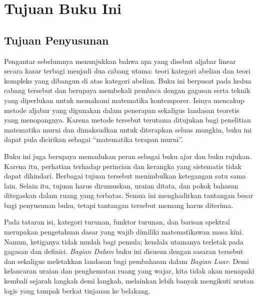 
\section*{Tujuan Buku Ini}
\hypertarget{o014.aljabr2.prelude.book-purpose}{ }

\subsection*{Tujuan Penyusunan}

Pengantar sebelumnya menunjukkan bahwa apa yang disebut aljabar linear
secara kasar terbagi menjadi dua cabang utama: teori kategori abelian dan
teori kompleks yang dibangun di atas kategori abelian. Buku ini berpusat
pada kedua cabang tersebut dan berupaya membekali pembaca dengan gagasan
serta teknik yang diperlukan untuk memahami matematika kontemporer.
Isinya mencakup metode aljabar yang digunakan dalam penerapan sekaligus
landasan teoretis yang menopangnya. Karena metode tersebut terutama
ditujukan bagi penelitian matematika murni dan dimaksudkan untuk diterapkan
seluas mungkin, buku ini dapat pula dicirikan sebagai
``matematika terapan murni''.

Buku ini juga berupaya memadukan peran sebagai buku ajar dan buku
rujukan. Karena itu, perhatian terhadap perincian dan kerangka yang
sistematis tidak dapat dihindari. Berbagai tujuan tersebut menimbulkan
ketegangan satu sama lain. Selain itu, tujuan harus dirumuskan, uraian ditata, dan
pokok bahasan ditegaskan dalam ruang yang terbatas. Semua ini menghadirkan
tantangan besar bagi penyusunan buku, tetapi tantangan tersebut memang
harus diterima.

Pada tataran isi, kategori turunan, funktor turunan, dan barisan spektral
merupakan pengetahuan dasar yang wajib dimiliki matematikawan masa kini.
Namun, ketiganya tidak mudah bagi pemula; kendala utamanya terletak pada
gagasan dan definisi. \emph{Bagian Dalam} buku ini disusun dengan sasaran
tersebut dan sekaligus meletakkan landasan bagi pembahasan dalam \emph{Bagian
Luar}. Demi kelancaran uraian dan penghematan ruang yang wajar, kita tidak
akan menapaki kembali sejarah langkah demi langkah, melainkan lebih banyak
mengikuti urutan logis yang tampak berkat tinjauan ke belakang.

